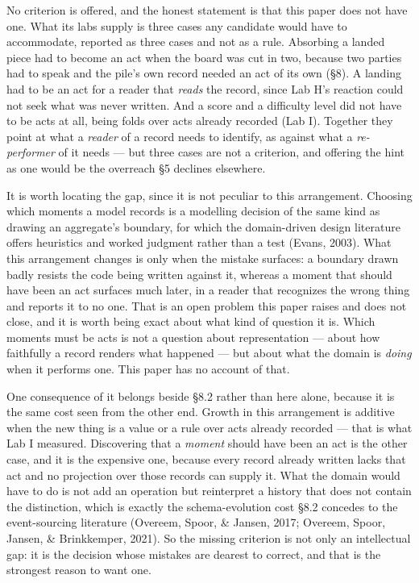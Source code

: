 \documentclass[
]{article}
\begin{document}
No criterion is offered, and the honest statement is that this paper
does not have one. What its labs supply is three cases any candidate
would have to accommodate, reported as three cases and not as a rule.
Absorbing a landed piece had to become an act when the board was cut in
two, because two parties had to speak and the pile's own record needed
an act of its own (§8). A landing had to be an act for a reader that
\emph{reads} the record, since Lab H's reaction could not seek what was
never written. And a score and a difficulty level did not have to be
acts at all, being folds over acts already recorded (Lab I). Together
they point at what a \emph{reader} of a record needs to identify, as
against what a \emph{re-performer} of it needs --- but three cases are
not a criterion, and offering the hint as one would be the overreach §5
declines elsewhere.

It is worth locating the gap, since it is not peculiar to this
arrangement. Choosing which moments a model records is a modelling
decision of the same kind as drawing an aggregate's boundary, for which
the domain-driven design literature offers heuristics and worked
judgment rather than a test (Evans, 2003). What this arrangement changes
is only when the mistake surfaces: a boundary drawn badly resists the
code being written against it, whereas a moment that should have been an
act surfaces much later, in a reader that recognizes the wrong thing and
reports it to no one. That is an open problem this paper raises and does
not close, and it is worth being exact about what kind of question it
is. Which moments must be acts is not a question about representation
--- about how faithfully a record renders what happened --- but about
what the domain is \emph{doing} when it performs one. This paper has no
account of that.

One consequence of it belongs beside §8.2 rather than here alone,
because it is the same cost seen from the other end. Growth in this
arrangement is additive when the new thing is a value or a rule over
acts already recorded --- that is what Lab I measured. Discovering that
a \emph{moment} should have been an act is the other case, and it is the
expensive one, because every record already written lacks that act and
no projection over those records can supply it. What the domain would
have to do is not add an operation but reinterpret a history that does
not contain the distinction, which is exactly the schema-evolution cost
§8.2 concedes to the event-sourcing literature (Overeem, Spoor, \&
Jansen, 2017; Overeem, Spoor, Jansen, \& Brinkkemper, 2021). So the
missing criterion is not only an intellectual gap: it is the decision
whose mistakes are dearest to correct, and that is the strongest reason
to want one.
\end{document}
